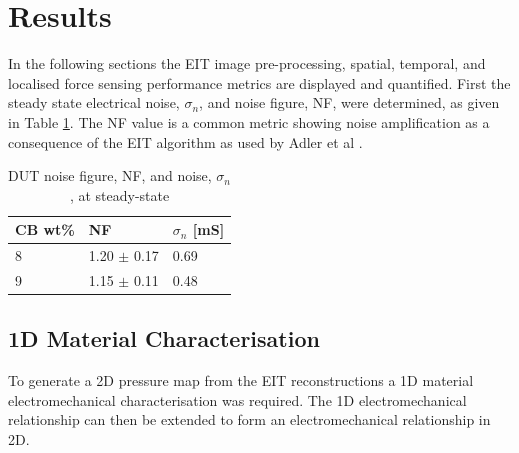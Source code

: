 \section{Results}\label{sec: Results}
In the following sections the EIT image pre-processing, spatial, temporal, and localised force sensing performance metrics are displayed and quantified. First the steady state electrical noise, $\sigma_n$, and noise figure, NF, were determined, as given in Table \ref{tab:DUT_noise}. The NF value is a common metric showing noise amplification as a consequence of the EIT algorithm as used by Adler et al \citep{Adler2009}.
\begin{table}[H]
\caption{DUT noise figure, NF, and noise, $\sigma_n$, at steady-state}
\label{tab:DUT_noise}
\begin{center}
\begin{tabular}{p{2cm}p{2cm}p{2cm}}
\hline
\textbf{CB wt\%} & \textbf{NF} & $\sigma_n$ [mS]\\ \hline
8           & 1.20 $\pm$ 0.17 & 0.69         \\
9           & 1.15 $\pm$ 0.11 & 0.48            \\ 
\hline
\end{tabular}
\end{center}
\end{table}


\subsection{1D Material Characterisation} \label{sec:1D Material Characterisation2}
To generate a 2D pressure map from the EIT reconstructions a 1D material electromechanical characterisation was required. The 1D electromechanical relationship can then be extended to form an electromechanical relationship in 2D.


